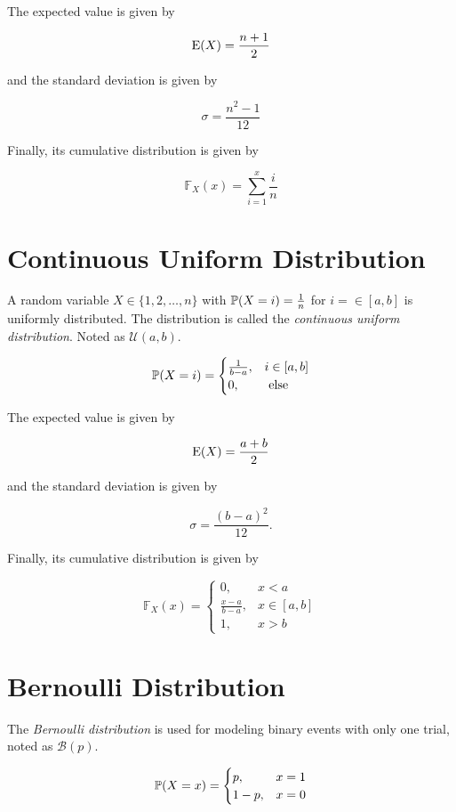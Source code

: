 The expected value is given by 

\[
    \mathrm{E}(X) = \frac{n + 1}{2}
\]

and the standard deviation is given by

\[
    \sigma = \frac{n^2 - 1}{12}
\]

Finally, its cumulative distribution is  given by 

\[
    \mathbb{F}_X(x) = \sum_{i = 1}^{x} \frac{i}{n}
\]

\section{Continuous Uniform Distribution}

A random variable \(X \in \{1, 2, \dots, n\}\) with 
\(\mathbb{P}(X = i) = \frac{1}{n}\) for \(i = \in [a, b]\) is uniformly distributed. 
The distribution is called the \emph{continuous uniform distribution}. Noted as 
\(\mathcal{U}(a,b)\).

\[
    \mathbb{P}(X = i) = 
    \begin{cases}
    \frac{1}{b - a}, & i \in [a, b]\\ 
    0, & \text{ else }
    \end{cases}
\]

The expected value is given by 

\[
    \mathrm{E}(X) = \frac{a + b}{2}
\]

and the standard deviation is given by

\[
    \sigma = \frac{(b - a)^2}{12}.
\]


Finally, its cumulative distribution is given by 

\[
    \mathbb{F}_X(x) =
    \begin{cases}
        0, &  x < a \\ 
        \frac{x - a}{b - a}, & x \in [a, b] \\
        1, & x > b
    \end{cases}
\]

\section{Bernoulli Distribution}

The \emph{Bernoulli distribution} is used for modeling binary events with only one trial, noted as \(\mathcal{B}(p)\).

\[
    \mathbb{P}(X = x) =
    \begin{cases}
        p, & x = 1 \\ 
        1 - p, & x = 0
    \end{cases}
\]

